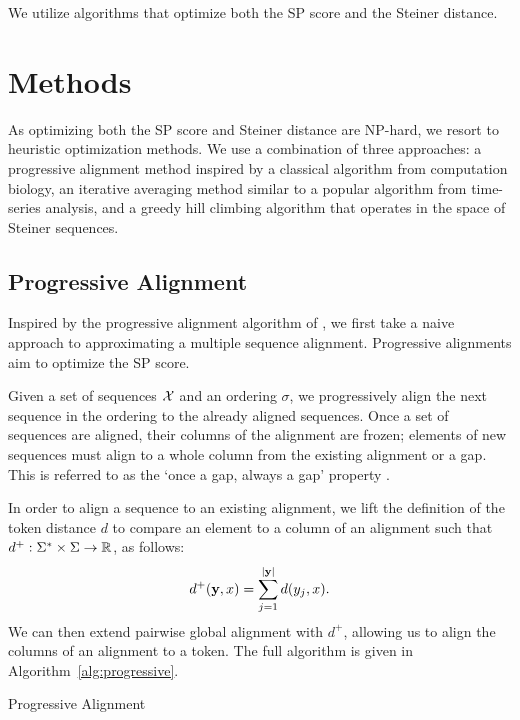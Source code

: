 \documentclass{article}
\begin{document}
We utilize algorithms that optimize both the SP score and the Steiner distance.

\section{Methods}
As optimizing both the SP score and Steiner distance are NP-hard,
we resort to heuristic optimization methods.
We use a combination of three approaches: a progressive alignment method
inspired by a classical algorithm from computation biology,
an iterative averaging method similar to a popular algorithm from time-series analysis,
and a greedy hill climbing algorithm that operates in the space of Steiner sequences.

\subsection{Progressive Alignment}
Inspired by the progressive alignment algorithm
of \citet{fengdoolittle}, we first take a naive approach to approximating
a multiple sequence alignment.
Progressive alignments aim to optimize the SP score.

Given a set of sequences $\mathcal{X}$ and an ordering $\sigma$,
we progressively align the next sequence in the ordering to the
already aligned sequences.
Once a set of sequences are aligned, their columns of the alignment are frozen;
elements of new sequences must align to a whole column
from the existing alignment or a gap.
This is referred to as the `once a gap, always a gap' property \citep{fengdoolittle}.

In order to align a sequence to an existing alignment, we lift the definition of
the token distance $d$ to compare an element to a column of an alignment 
such that $d^+: \Sigma^*\times\Sigma\to\mathbb{R}$, as follows:
\begin{equation}
\label{eqn:dplus}
d^+(\mathbf{y}, x) = \sum_{j=1}^{|\mathbf{y}|} d(y_j, x).
\end{equation}
We can then extend pairwise global alignment with $d^+$, allowing us to
align the columns of an alignment to a token.
The full algorithm is given in Algorithm~\ref{alg:progressive}.

\begin{algorithm}[h]
\begin{algorithmic}
\EndFor
{}
\end{algorithmic}
\caption{\label{alg:progressive}
Progressive Alignment
}
\end{algorithm}
\end{document}
